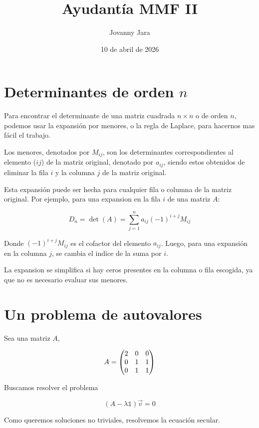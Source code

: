\documentclass[11pt]{article}
\title{Ayudantía MMF II}
\author{Jovanny Jara}
\date{10 de abril de 2026}
\begin{document}
\maketitle

\section{Determinantes de orden $n$}

Para encontrar el determinante de una matriz cuadrada $n\times n$ o de orden $n$, podemos usar la expansión por menores, o la regla de Laplace, para hacernos mas fácil el trabajo.

Los menores, denotados por $M_{ij}$, son los determinantes correspondientes al elemento ($ij$) de la matriz original, denotado por $a_{ij}$, siendo estos obtenidos de eliminar la fila $i$ y la columna $j$ de la matriz original.

Esta expansión puede ser hecha para cualquier fila o columna de la matriz original. Por ejemplo, para una expansion en la fila $i$ de una matriz $A$:

\begin{equation}
    D_n = \det(A) = \sum_{j=1}^n a_{ij}(-1)^{i+j}M_{ij}
\end{equation}

Donde $(-1)^{i+j}M_{ij}$ es el cofactor del elemento $a_{ij}$. Luego, para una expansión en la columna $j$, se cambia el indice de la suma por $i$. 

La expansion se simplifica si hay ceros presentes en la columna o fila escogida, ya que no es necesario evaluar sus menores.

\section{Un problema de autovalores}

Sea una matriz $A$,

\begin{equation}
    A = \mqty(2 & 0 & 0 \\ 0 & 1 & 1 \\ 0 & 1 & 1)
\end{equation}

Buscamos resolver el problema

\begin{equation}
    (A - \lambda\mathds{1})\vec{v} = 0
\end{equation}

Como queremos soluciones no triviales, resolvemos la ecuación secular.
\end{document}
